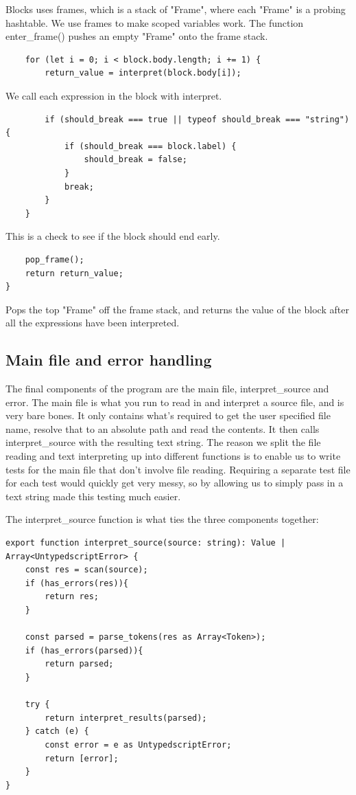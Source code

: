 \documentclass[12pt,a4paper]{article}
\begin{document}
Blocks uses frames, which is a stack of "Frame", where each "Frame" is a probing hashtable. We use frames to make scoped variables work. The function enter_frame() pushes an empty "Frame" onto the frame stack.

\begin{lstlisting}
    for (let i = 0; i < block.body.length; i += 1) {
        return_value = interpret(block.body[i]);
\end{lstlisting}

We call each expression in the block with interpret.

\begin{lstlisting}
        if (should_break === true || typeof should_break === "string") {
            if (should_break === block.label) {
                should_break = false;
            }
            break;
        }
    }
\end{lstlisting}

This is a check to see if the block should end early.

\begin{lstlisting}
    pop_frame();
    return return_value;
}
\end{lstlisting}

Pops the top "Frame" off the frame stack, and returns the value of the block after all the expressions have been interpreted.

\subsection{Main file and error handling}

The final components of the program are the main file, interpret_source and error. The main file is what you run to read in and interpret a source file, and is very bare bones. It only contains what's required to get the user specified file name, resolve that to an absolute path and read the contents. It then calls interpret_source with the resulting text string. The reason we split the file reading and text interpreting up into different functions is to enable us to write tests for the main file that don't involve file reading. Requiring a separate test file for each test would quickly get very messy, so by allowing us to simply pass in a text string made this testing much easier.

The interpret_source function is what ties the three components together:

\begin{lstlisting}
export function interpret_source(source: string): Value | Array<UntypedscriptError> {
    const res = scan(source);
    if (has_errors(res)){
        return res;
    }

    const parsed = parse_tokens(res as Array<Token>);
    if (has_errors(parsed)){
        return parsed;
    }

    try {
        return interpret_results(parsed);
    } catch (e) {
        const error = e as UntypedscriptError;
        return [error];
    }
}
\end{lstlisting}
\end{document}

